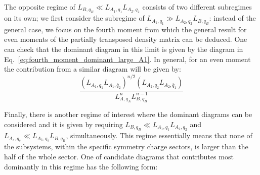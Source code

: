\documentclass[aps,pra,reprint,superscriptaddress,twocolumn,notitlepage]{revtex4-1}
\numberwithin{equation}{section}
\begin{document}
The opposite regime of $L_{B,q_B} \ll L_{A_1,q_1} L_{A_2,q_2}$ consists of two different subregimes on its own; we first consider the subregime of $L_{A_1,q_1} \gg L_{A_2,q_2} L_{B,q_B}$: instead of the general case, we focus on the fourth moment from which the general result for even moments of the partially transposed density matrix can be deduced. One can check that the dominant diagram in this limit is given by the diagram in Eq.~\eqref{eq:fourth_moment_dominant_large_A1}. In general, for an even moment the contribution from a similar diagram will be given by:
\begin{equation}
    \frac{(L_{A_1,q_1} L_{A_1,\bar{q}_2})^{n/2} (L_{A_2,q_2} L_{A_2,\bar{q}_1} )}{ L_{A,q_A}^n L_{B,q_B}^{n-1}}
\end{equation}

Finally, there is another regime of interest where the dominant diagrams can be considered and it is given by requiring  $L_{B,q_B} \ll L_{A_1,q_1} L_{A_2,q_2}$ and $L_{A_s,q_s} \ll L_{A_{\bar{s}},q_{\bar{s}}} L_{B,q_B}$, simultaneously. This regime essentially means that none of the subsystems, within the specific symmetry charge sectors, is larger than the half of the whole sector. One of candidate diagrams that contributes most dominantly in this regime has the following form:
\end{document}
